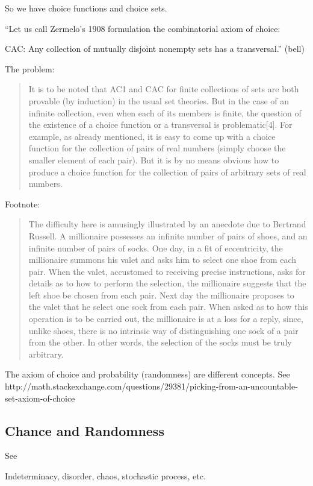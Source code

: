 \documentclass[reqno,12pt]{article}
\numberwithin{equation}{subsection}
\begin{document}
So we have choice functions and choice sets.


``Let us call Zermelo's 1908 formulation the combinatorial axiom of choice:

CAC: 
Any collection of mutually disjoint nonempty sets has a transversal.'' (bell)


The problem:


\blockquote{It is to be noted that AC1 and CAC for finite collections
  of sets are both provable (by induction) in the usual set
  theories. But in the case of an infinite collection, even when each
  of its members is finite, the question of the existence of a choice
  function or a transversal is problematic[4]. For example, as already
  mentioned, it is easy to come up with a choice function for the
  collection of pairs of real numbers (simply choose the smaller
  element of each pair). But it is by no means obvious how to produce
  a choice function for the collection of pairs of arbitrary sets of
  real numbers.\parencite{bell_axiom_2013}}

Footnote: 
\blockquote{The difficulty here is amusingly illustrated by an anecdote due to Bertrand Russell. A millionaire possesses an infinite number of pairs of shoes, and an infinite number of pairs of socks. One day, in a fit of eccentricity, the millionaire summons his valet and asks him to select one shoe from each pair. When the valet, accustomed to receiving precise instructions, asks for details as to how to perform the selection, the millionaire suggests that the left shoe be chosen from each pair. Next day the millionaire proposes to the valet that he select one sock from each pair. When asked as to how this operation is to be carried out, the millionaire is at a loss for a reply, since, unlike shoes, there is no intrinsic way of distinguishing one sock of a pair from the other. In other words, the selection of the socks must be truly arbitrary.}

The axiom of choice and probability (randomness) are different
concepts.  See
http://math.stackexchange.com/questions/29381/picking-from-an-uncountable-set-axiom-of-choice

\subsection{Chance and Randomness}

See \parencite{eagle_chance_2014}

Indeterminacy, disorder, chaos, stochastic process, etc.
\end{document}
